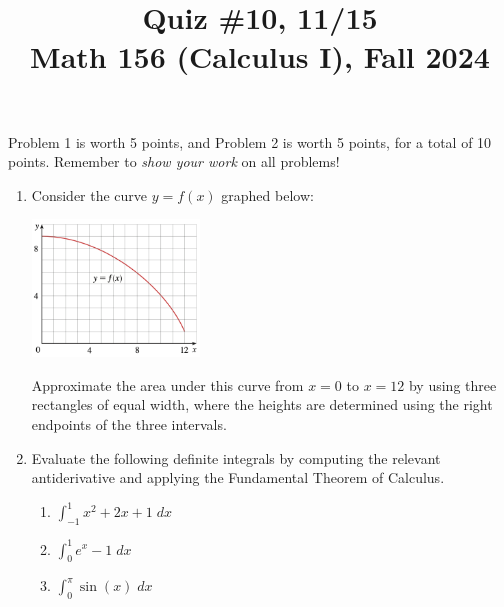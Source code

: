 \documentclass[11pt]{article}
\title{Quiz \#10, 11/15 \\ Math 156 (Calculus I), Fall 2024}
\date{}
\begin{document}
\maketitle

\thispagestyle{empty}

\vspace{-2cm}

Problem 1 is worth 5 points, and Problem 2 is worth 5 points, for a total of 10 points. Remember to \emph{show your work} on all problems!

\begin{enumerate}
\item Consider the curve $y=f(x)$ graphed below:
\vspace{-0.25cm}
\begin{center}\includegraphics[width=1.75in]{quiz10.png}\end{center}
\vspace{-0.3cm}
Approximate the area under this curve from $x=0$ to $x=12$ by using three rectangles of equal width, where the heights are determined using the right endpoints of the three intervals.

\vspace{4cm}

\item Evaluate the following definite integrals by computing the relevant antiderivative and applying the Fundamental Theorem of Calculus.
\begin{enumerate}
\item $\int_{-1}^{1} x^2 + 2x + 1 \; dx$
\item $\int_{0}^{1} e^x - 1 \; dx$
\item $\int_{0}^{\pi} \sin(x) \; dx$
\end{enumerate}
\end{enumerate}
\end{document}
